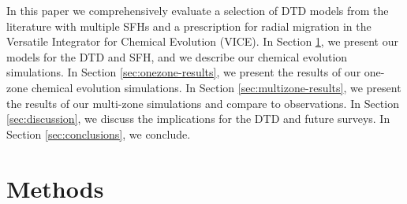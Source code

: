 \documentclass[modern,linenumbers]{aastex631}
\begin{document}
In this paper we comprehensively evaluate a selection of DTD models from the literature with multiple SFHs and a prescription for radial migration in the Versatile Integrator for Chemical Evolution (VICE). In Section \ref{sec:methods}, we present our models for the DTD and SFH, and we describe our chemical evolution simulations. In Section \ref{sec:onezone-results}, we present the results of our one-zone chemical evolution simulations. In Section \ref{sec:multizone-results}, we present the results of our multi-zone simulations and compare to observations. In Section \ref{sec:discussion}, we discuss the implications for the DTD and future surveys. In Section \ref{sec:conclusions}, we conclude.

\section{Methods}
\label{sec:methods}
\end{document}
